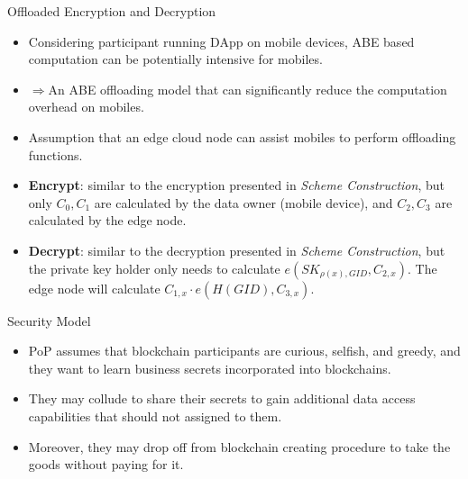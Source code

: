 \documentclass[11pt]{beamer}
\begin{document}
\begin{frame}[allowframebreaks]{Offloaded Encryption and Decryption}

\begin{itemize}
\item Considering participant running DApp on mobile devices, ABE based computation can be potentially intensive for mobiles.
\item $\Rightarrow$An ABE offloading model that can significantly reduce the computation overhead on mobiles.
\item Assumption that an edge cloud node can assist mobiles to perform offloading functions.
\item \textbf{Encrypt}: similar to the encryption presented in \textit{Scheme Construction}, but only $C_0, C_1$ are calculated by the data owner (mobile device), and $C_2,C_3$ are calculated by the edge node.
\item \textbf{Decrypt}: similar to the decryption presented in \textit{Scheme Construction}, but the private key holder only needs to calculate $e(SK_{\rho(x), GID}, C_{2,x})$. The edge node will calculate $C_{1,x}\cdot e(H(GID),C_{3,x})$.
\end{itemize}

\end{frame}

\begin{frame}{Security Model}
\begin{itemize}
\item PoP assumes that blockchain participants are curious, selfish, and greedy, and they want to learn business secrets incorporated into blockchains.
\item They may collude to share their secrets to gain additional data access capabilities that should not assigned to them.
\item Moreover, they may drop off from blockchain creating procedure to take the goods without paying for it.
\end{itemize}
\end{frame}
\end{document}
